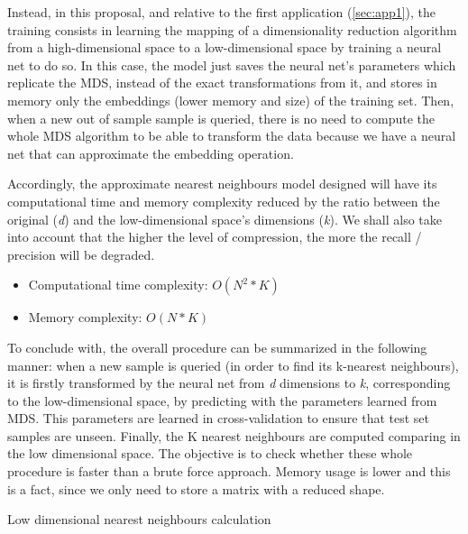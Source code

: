 \documentclass[a4paper,11pt,spanish]{report}
\makeatletter
\def\BState{\State\hskip-\ALG@thistlm}
\makeatother
\begin{document}
Instead, in this proposal, and relative to the first application (\ref{sec:app1}), the training consists in learning the mapping of a dimensionality reduction algorithm from a high-dimensional space to a low-dimensional space by training a neural net to do so. In this case, the model just saves the neural net's parameters which replicate the MDS, instead of the exact transformations from it, and stores in memory only the embeddings (lower memory and size) of the training set. Then, when a new out of sample sample is queried, there is no need to compute the whole MDS algorithm to be able to transform the data because we have a neural net that can approximate the embedding operation.

Accordingly, the approximate nearest neighbours model designed will have its computational time and memory complexity reduced by the ratio between the original (\textit{d}) and the low-dimensional space's dimensions (\textit{k}). We shall also take into account that the higher the level of compression, the more the recall / precision will be degraded.

\begin{itemize}
\item Computational time complexity: $O(N^{2}*K)$
\item Memory complexity: $O(N*K)$
\end{itemize}

To conclude with, the overall procedure can be summarized in the following manner: when a new sample is queried (in order to find its k-nearest neighbours), it is firstly transformed by the neural net from \textit{d} dimensions to \textit{k}, corresponding to the low-dimensional space, by predicting with the parameters learned from MDS. This parameters are learned in cross-validation to ensure that test set samples are unseen. Finally, the K nearest neighbours are computed comparing in the low  dimensional space. The objective is to check whether these whole procedure is faster than a brute force approach. Memory usage is lower and this is a fact, since we only need to store a matrix with a reduced shape.

\vspace{25px}
\begin{algorithm}
\caption{Low dimensional nearest neighbours calculation}
\label{alg2}
\end{algorithm}
\hfill
\end{document}
